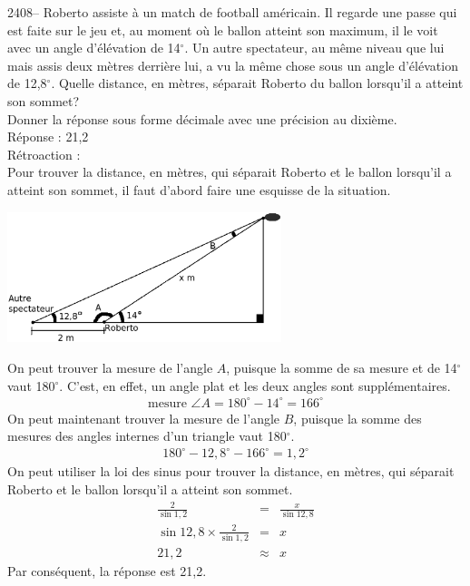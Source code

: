\documentclass[letterpaper, 12pt]{article}
\begin{document}
2408-- Roberto assiste \`a un match de football am\'ericain. Il regarde une passe qui est faite sur le jeu et, au moment o\`u le ballon atteint son maximum, il le voit avec un angle d'\'el\'evation de 14$^{\circ}$. Un autre spectateur, au m\^eme niveau que lui mais assis deux m\`etres derri\`ere lui, a vu la m\^eme chose sous un angle d'\'el\'evation de 12,8$^{\circ}$. Quelle distance, en m\`etres, s\'eparait Roberto du ballon lorsqu'il a atteint son sommet?\\
Donner la r\'eponse sous forme d\'ecimale avec une pr\'ecision au dixi\`eme.\\

R\'eponse : 21,2\\

R\'etroaction :\\
Pour trouver la distance, en m\`etres, qui s\'eparait Roberto et le ballon lorsqu'il a atteint son sommet, il faut d'abord faire une esquisse de la situation.
\begin{center}
 \includegraphics[width=8cm,bb=0 408 689 842]{Q2408.eps}
\end{center}
On peut trouver la mesure de l'angle $A$, puisque la somme de sa mesure et de 14$^{\circ}$ vaut 180$^{\circ}$. C'est, en effet, un angle plat et les deux angles sont suppl\'ementaires.
\begin{eqnarray*}
\textrm{mesure }\angle{A} = 180^{\circ}-14^{\circ} = 166 ^{\circ}
\end{eqnarray*}
On peut maintenant trouver la mesure de l'angle $B$, puisque la somme des mesures des angles internes d'un triangle vaut 180$^{\circ}$.
\begin{eqnarray*}
 180^{\circ}-12,8^{\circ}-166^{\circ}=1,2^{\circ}
\end{eqnarray*}
On peut utiliser la loi des sinus pour trouver la distance, en m\`etres,  qui s\'eparait Roberto et le ballon lorsqu'il a atteint son sommet.
\begin{eqnarray*}
 \frac{2}{\sin{1,2}}&=& \frac{x}{\sin{12,8}}\\[2mm]
 \sin{12,8} \times \frac{2}{\sin{1,2}}&=&  x\\[2mm]
 21,2&\approx&  x
\end{eqnarray*}
Par cons\'equent, la r\'eponse est 21,2.\\
\end{document}
